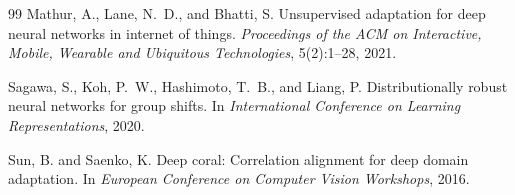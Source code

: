 \documentclass[12pt]{article}
\begin{document}
\begin{thebibliography}{99}
Mathur, A., Lane, N.~D., and Bhatti, S.
\newblock Unsupervised adaptation for deep neural networks in internet of things.
\newblock \emph{Proceedings of the ACM on Interactive, Mobile, Wearable and Ubiquitous Technologies}, 5(2):1--28, 2021.

Sagawa, S., Koh, P.~W., Hashimoto, T.~B., and Liang, P.
\newblock Distributionally robust neural networks for group shifts.
\newblock In \emph{International Conference on Learning Representations}, 2020.

Sun, B. and Saenko, K.
\newblock Deep coral: Correlation alignment for deep domain adaptation.
\newblock In \emph{European Conference on Computer Vision Workshops}, 2016.

\end{thebibliography}
\end{document}

